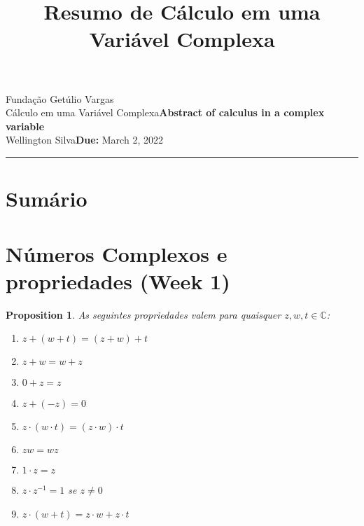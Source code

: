 \documentclass{article}
\title{Resumo de Cálculo em uma Variável Complexa}
\author{}
\date{}
\newtheorem{prop}{Proposition}
\newcommand{\assignment}{Abstract of calculus in a complex variable}
\newcommand{\duedate}{March 2, 2022}
\begin{document}
Fundação Getúlio Vargas\hfill\\
Cálculo em uma Variável Complexa\hfill\textbf{\assignment}\\
Wellington Silva\hfill\textbf{Due:} \duedate\\
\smallskip\hrule\bigskip

{\let\newpage\relax\maketitle}
\maketitle

\section*{Sumário}

\textbf{}
\vspace{4.0mm}

\textbf{}
\vspace{4.0mm}


\newpage

\section*{Números Complexos e propriedades (Week 1)}
\label{s1}

\begin{prop} As seguintes propriedades valem para quaisquer $z, w, t \in \mathbb{C}$:

\begin{enumerate}[label=(\alph*)]
    \item $z + (w + t) = (z + w) + t$
    \item $z + w = w + z$
    \item $0 + z = z$
    \item $z + (-z) = 0$
    \item $z \cdot (w \cdot t) = (z \cdot w) \cdot t$
    \item $zw = wz$
    \item $1 \cdot z = z$
    \item $z \cdot z^{-1} = 1$ se $z \neq 0$
    \item $z \cdot (w + t) = z \cdot w + z \cdot t$
\end{enumerate}
\end{prop}
\end{document}
